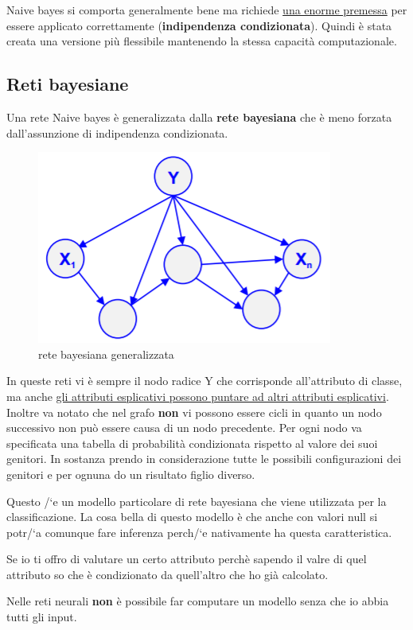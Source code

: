 Naive bayes si comporta generalmente bene ma richiede \underline{una enorme premessa} per essere applicato correttamente (\textbf{indipendenza condizionata}). Quindi \`e stata creata una versione pi\`u flessibile mantenendo la stessa capacit\`a computazionale.

\subsection{Reti bayesiane}
Una rete Naive bayes \`e generalizzata dalla \textbf{rete bayesiana} che \`e meno forzata dall'assunzione di indipendenza condizionata. 

\begin{figure}[h!]
	\centering
	\includegraphics[height=0.35 \linewidth]{classification/pict/networkbayes.png}
	\caption{rete bayesiana generalizzata}
\end{figure}

In queste reti vi \`e sempre il nodo radice Y che corrisponde all'attributo di classe, ma anche \underline{gli attributi esplicativi possono puntare ad altri attributi esplicativi}. Inoltre va notato che nel grafo \textbf{non} vi possono essere cicli in quanto un nodo successivo non pu\`o essere causa di un nodo precedente. Per ogni nodo va specificata una tabella di probabilit\`a condizionata rispetto al valore dei suoi genitori. In sostanza prendo in considerazione tutte le possibili configurazioni dei genitori e per ognuna do un risultato figlio diverso.

Questo /`e un modello particolare di rete bayesiana che viene utilizzata per la classificazione. La cosa bella di questo modello \`e che anche con valori null si potr/`a comunque fare inferenza perch/`e nativamente ha questa caratteristica. 

Se io ti offro di valutare un certo attributo perch\`e sapendo il valre di quel attributo so che \`e condizionato da quell'altro che ho gi\`a calcolato.  

Nelle reti neurali \textbf{non} \`e possibile far computare un modello senza che io abbia tutti gli input. 
\\

